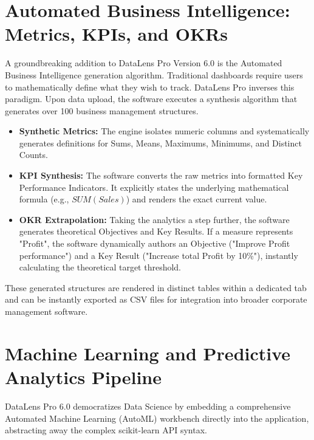 \documentclass[12pt, a4paper]{article}
\begin{document}
\section{Automated Business Intelligence: Metrics, KPIs, and OKRs}
A groundbreaking addition to DataLens Pro Version 6.0 is the Automated Business Intelligence generation algorithm. Traditional dashboards require users to mathematically define what they wish to track. DataLens Pro inverses this paradigm.
Upon data upload, the software executes a synthesis algorithm that generates over 100 business management structures.
\begin{itemize}
    \item \textbf{Synthetic Metrics:} The engine isolates numeric columns and systematically generates definitions for Sums, Means, Maximums, Minimums, and Distinct Counts.
    \item \textbf{KPI Synthesis:} The software converts the raw metrics into formatted Key Performance Indicators. It explicitly states the underlying mathematical formula (e.g., $SUM(Sales)$) and renders the exact current value.
    \item \textbf{OKR Extrapolation:} Taking the analytics a step further, the software generates theoretical Objectives and Key Results. If a measure represents "Profit", the software dynamically authors an Objective ("Improve Profit performance") and a Key Result ("Increase total Profit by 10\%"), instantly calculating the theoretical target threshold. 
\end{itemize}
These generated structures are rendered in distinct tables within a dedicated tab and can be instantly exported as CSV files for integration into broader corporate management software.
\section{Machine Learning and Predictive Analytics Pipeline}
DataLens Pro 6.0 democratizes Data Science by embedding a comprehensive Automated Machine Learning (AutoML) workbench directly into the application, abstracting away the complex scikit-learn API syntax.
\end{document}
